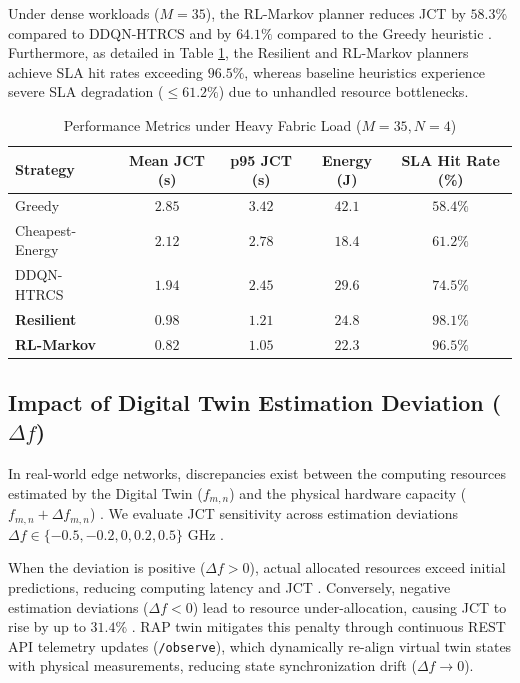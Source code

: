 \documentclass[twoside,twocolumn,10pt]{article}
\begin{document}
Under dense workloads ($M=35$), the RL-Markov planner reduces JCT by $58.3\%$ compared to DDQN-HTRCS and by $64.1\%$ compared to the Greedy heuristic \cite{xu2023}. Furthermore, as detailed in Table \ref{tab:slo_benchmark}, the Resilient and RL-Markov planners achieve SLA hit rates exceeding $96.5\%$, whereas baseline heuristics experience severe SLA degradation ($\le 61.2\%$) due to unhandled resource bottlenecks.

\begin{table}[htbp]
\caption{Performance Metrics under Heavy Fabric Load ($M=35, N=4$)}
\label{tab:slo_benchmark}
\centering
\begin{tabular}{|l|c|c|c|c|}
\hline
\textbf{Strategy} & \textbf{Mean JCT (s)} & \textbf{p95 JCT (s)} & \textbf{Energy (J)} & \textbf{SLA Hit Rate (\%)} \\
\hline
Greedy & $2.85$ & $3.42$ & $42.1$ & $58.4\%$ \\
Cheapest-Energy & $2.12$ & $2.78$ & $\mathbf{18.4}$ & $61.2\%$ \\
DDQN-HTRCS & $1.94$ & $2.45$ & $29.6$ & $74.5\%$ \\
\textbf{Resilient} & $0.98$ & $1.21$ & $24.8$ & $\mathbf{98.1\%}$ \\
\textbf{RL-Markov} & $\mathbf{0.82}$ & $\mathbf{1.05}$ & $22.3$ & $96.5\%$ \\
\hline
\end{tabular}
\end{table}

\subsection{Impact of Digital Twin Estimation Deviation ($\Delta f$)}
In real-world edge networks, discrepancies exist between the computing resources estimated by the Digital Twin ($f_{m,n}$) and the physical hardware capacity ($f_{m,n} + \Delta f_{m,n}$) \cite{xu2023, dai2024}. We evaluate JCT sensitivity across estimation deviations $\Delta f \in \{-0.5, -0.2, 0, 0.2, 0.5\}\text{ GHz}$ \cite{kim2022}.

When the deviation is positive ($\Delta f > 0$), actual allocated resources exceed initial predictions, reducing computing latency and JCT \cite{xu2023}. Conversely, negative estimation deviations ($\Delta f < 0$) lead to resource under-allocation, causing JCT to rise by up to $31.4\%$ \cite{dai2024}. RAP twin mitigates this penalty through continuous REST API telemetry updates (\texttt{/observe}), which dynamically re-align virtual twin states with physical measurements, reducing state synchronization drift ($\Delta f \to 0$).
\end{document}
